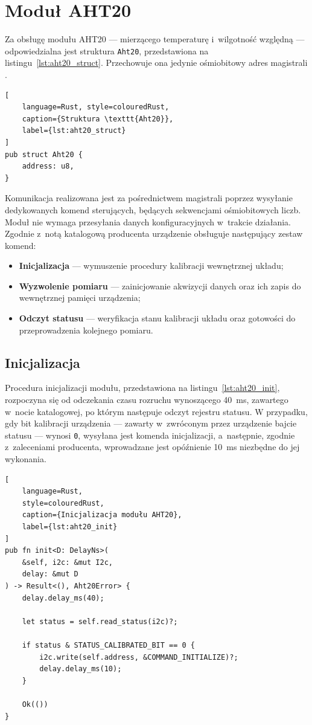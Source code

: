 \section{Moduł AHT20}
Za obsługę modułu AHT20 --- mierzącego temperaturę i~wilgotność względną 
--- odpowiedzialna jest struktura \texttt{Aht20}, przedstawiona na 
listingu~\ref{lst:aht20_struct}. Przechowuje ona jedynie ośmiobitowy
adres magistrali \isqrc{}.

\begin{lstlisting}[
    language=Rust, style=colouredRust, 
    caption={Struktura \texttt{Aht20}},
    label={lst:aht20_struct}
]
pub struct Aht20 {
    address: u8,
}
\end{lstlisting}

Komunikacja realizowana jest za pośrednictwem magistrali \isqrc{} poprzez 
wysyłanie dedykowanych komend sterujących, będących sekwencjami
ośmiobitowych liczb. 
Moduł nie wymaga przesyłania danych konfiguracyjnych w~trakcie działania. 
Zgodnie z~notą katalogową producenta \cite{AHT20} urządzenie obsługuje 
następujący zestaw komend:
\begin{itemize}
    \item \textbf{Inicjalizacja} --- wymuszenie procedury kalibracji 
    wewnętrznej układu;

    \item \textbf{Wyzwolenie pomiaru} --- zainicjowanie akwizycji danych 
    oraz ich zapis do wewnętrznej pamięci urządzenia;

    \item \textbf{Odczyt statusu} --- weryfikacja stanu kalibracji układu 
    oraz gotowości do przeprowadzenia kolejnego pomiaru.
\end{itemize}

\subsection*{Inicjalizacja}
Procedura inicjalizacji modułu, przedstawiona na listingu~\ref*{lst:aht20_init},
rozpoczyna się od odczekania czasu rozruchu wynoszącego \SI{40}{\milli\second},
zawartego w~nocie katalogowej, 
po którym następuje odczyt rejestru statusu. 
W przypadku, gdy bit kalibracji urządzenia  --- zawarty w~zwróconym przez 
urządzenie bajcie statusu --- wynosi \texttt{0},
wysyłana jest komenda inicjalizacji, a~następnie, zgodnie z~zaleceniami 
producenta, wprowadzane jest opóźnienie 
\SI{10}{\milli\second} niezbędne do jej wykonania.

\begin{lstlisting}[
    language=Rust, 
    style=colouredRust, 
    caption={Inicjalizacja modułu AHT20}, 
    label={lst:aht20_init}
]
pub fn init<D: DelayNs>(
    &self, i2c: &mut I2c, 
    delay: &mut D
) -> Result<(), Aht20Error> {
    delay.delay_ms(40);

    let status = self.read_status(i2c)?;

    if status & STATUS_CALIBRATED_BIT == 0 {
        i2c.write(self.address, &COMMAND_INITIALIZE)?;
        delay.delay_ms(10);
    }

    Ok(())
}
\end{lstlisting}

